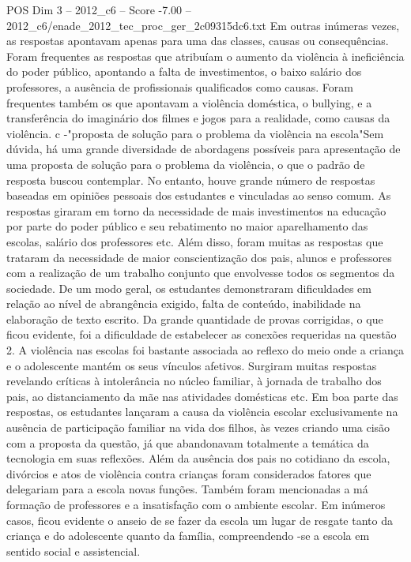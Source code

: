\begin{textsample}{POS Dim 3 – 2012\_c6 – Score -7.00 – 2012\_c6/enade\_2012\_tec\_proc\_ger\_2c09315dc6.txt}
Em outras inúmeras vezes, as respostas apontavam apenas para uma das classes, causas ou consequências.
Foram frequentes as respostas que atribuíam o aumento da violência à ineficiência do poder público, apontando a falta de investimentos, o baixo salário dos professores, a ausência de profissionais qualificados como causas.
Foram frequentes também os que apontavam a violência doméstica, o bullying, e a transferência do imaginário dos filmes e jogos para a realidade, como causas da violência. c -"proposta de solução para o problema da violência na escola"Sem dúvida, há uma grande diversidade de abordagens possíveis para apresentação de uma proposta de solução para o problema da violência, o que o padrão de resposta buscou contemplar.
No entanto, houve grande número de respostas baseadas em opiniões pessoais dos estudantes e vinculadas ao senso comum.
As respostas giraram em torno da necessidade de mais investimentos na educação por parte do poder público e seu rebatimento no maior aparelhamento das escolas, salário dos professores etc.
Além disso, foram muitas as respostas que trataram da necessidade de maior conscientização dos pais, alunos e professores com a realização de um trabalho conjunto que envolvesse todos os segmentos da sociedade.
De um modo geral, os estudantes demonstraram dificuldades em relação ao nível de abrangência exigido, falta de conteúdo, inabilidade na elaboração de texto escrito.
Da grande quantidade de provas corrigidas, o que ficou evidente, foi a dificuldade de estabelecer as conexões requeridas na questão 2.
A violência nas escolas foi bastante associada ao reflexo do meio onde a criança e o adolescente mantém os seus vínculos afetivos.
Surgiram muitas respostas revelando críticas à intolerância no núcleo familiar, à jornada de trabalho dos pais, ao distanciamento da mãe nas atividades domésticas etc.
Em boa parte das respostas, os estudantes lançaram a causa da violência escolar exclusivamente na ausência de participação familiar na vida dos filhos, às vezes criando uma cisão com a proposta da questão, já que abandonavam totalmente a temática da tecnologia em suas reflexões.
Além da ausência dos pais no cotidiano da escola, divórcios e atos de violência contra crianças foram considerados fatores que delegariam para a escola novas funções.
Também foram mencionadas a má formação de professores e a insatisfação com o ambiente escolar.
Em inúmeros casos, ficou evidente o anseio de se fazer da escola um lugar de resgate tanto da criança e do adolescente quanto da família, compreendendo -se a escola em sentido social e assistencial.

\end{textsample}
